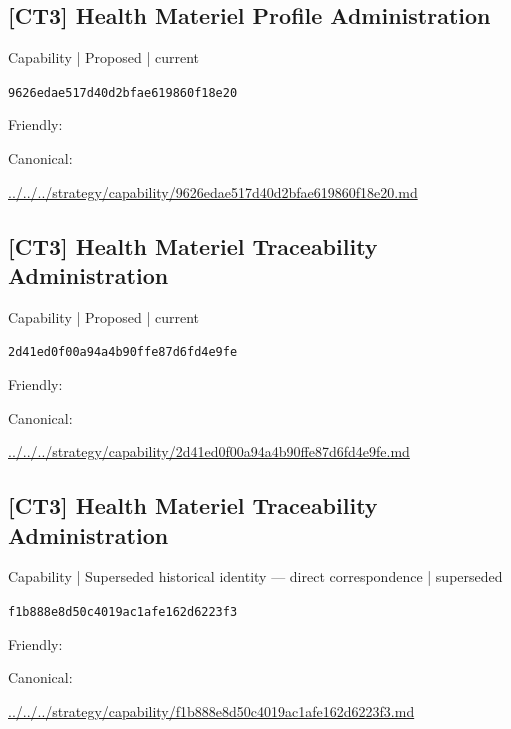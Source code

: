 \documentclass[10pt,a4paper]{article}
\begin{document}
\subsection*{[CT3] Health Materiel Profile Administration}
{\small Capability | Proposed | current}\par
\texttt{9626edae517d40d2bfae619860f18e20}\par
Friendly: \par
Canonical: \par
{\footnotesize\url{../../../strategy/capability/9626edae517d40d2bfae619860f18e20.md}}\par
\subsection*{[CT3] Health Materiel Traceability Administration}
{\small Capability | Proposed | current}\par
\texttt{2d41ed0f00a94a4b90ffe87d6fd4e9fe}\par
Friendly: \par
Canonical: \par
{\footnotesize\url{../../../strategy/capability/2d41ed0f00a94a4b90ffe87d6fd4e9fe.md}}\par
\subsection*{[CT3] Health Materiel Traceability Administration}
{\small Capability | Superseded historical identity — direct correspondence | superseded}\par
\texttt{f1b888e8d50c4019ac1afe162d6223f3}\par
Friendly: \par
Canonical: \par
{\footnotesize\url{../../../strategy/capability/f1b888e8d50c4019ac1afe162d6223f3.md}}\par
\end{document}
